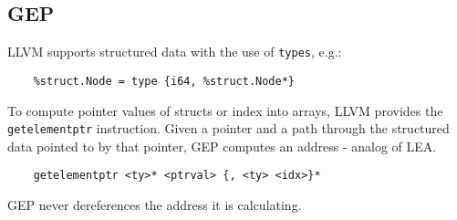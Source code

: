 \subsection*{GEP}

LLVM supports structured data with the use of \texttt{types}, e.g.:\medskip

\begin{lstlisting}
	%struct.Node = type {i64, %struct.Node*}
\end{lstlisting}\medskip

To compute pointer values of structs or index into arrays, LLVM provides the \texttt{getelementptr} instruction. Given a pointer and a path through the structured data pointed to by that pointer, GEP computes an address - analog of LEA.\medskip

\begin{lstlisting}
	getelementptr <ty>* <ptrval> {, <ty> <idx>}* 
\end{lstlisting}\medskip

GEP never dereferences the address it is calculating.
